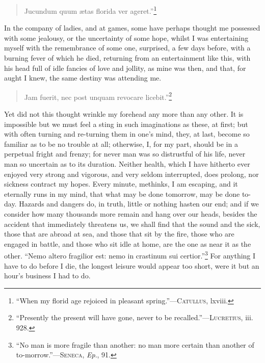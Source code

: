 \begin{verse}
Jucundum quum \ae tas florida ver ageret.''\footnote{``When
my florid age rejoiced in pleasant spring.''---\textsc{Catullus},
lxviii.}
\end{verse}

In the company of ladies, and at games, some have perhaps thought me
possessed with some jealousy, or the uncertainty of some hope, whilst
I was entertaining myself with the remembrance of some one, surprised,
a few days before, with a burning fever of which he died, returning
from an entertainment like this, with his head full of idle fancies of
love and jollity, as mine was then, and that, for aught I knew, the
same destiny was attending me.

\begin{verse}
Jam fuerit, nec post unquam revocare
licebit.''\footnote{``Presently the present will have gone, never to
be recalled.''---\textsc{Lucretius}, iii. 928.}
\end{verse}

\noindent Yet did not this thought wrinkle my forehead any more than
any other. It is impossible but we must feel a sting in such
imaginations as these, at first; but with often turning and re-turning
them in one's mind, they, at last,  become so familiar as to
be no trouble at all; otherwise, I, for my part, should be in a
perpetual fright and frenzy; for never man was so distrustful of his
life, never man so uncertain as to its duration. Neither health,
which I have hitherto ever enjoyed very strong and vigorous, and very
seldom interrupted, does prolong, nor sickness contract my hopes.
Every minute, methinks, I am escaping, and it eternally runs in my
mind, that what may be done tomorrow, may be done to-day. Hazards
and dangers do, in truth, little or nothing hasten our end; and if we
consider how many thousands more remain and hang over our heads,
besides the accident that immediately threatens us, we shall find that
the sound and the sick, those that are abroad at sea, and those that
sit by the fire, those who are engaged in battle, and those who sit
idle at home, are the one as near it as the other. ``Nemo altero
fragilior est: nemo in crastinum sui certior.''\footnote{``No man is
more fragile than another: no man more certain than another of
to-morrow.''---\textsc{Seneca}, \textit{Ep}., 91.} For anything I have
to do before I die, the longest leisure would appear too short, were
it but an hour's business I had to do.

